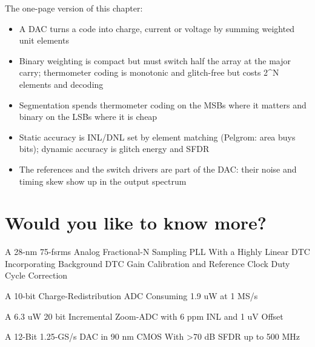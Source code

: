 The one-page version of this chapter:

\begin{itemize}
\tightlist
\item
  A DAC turns a code into charge, current or voltage by summing weighted
  unit elements
\item
  Binary weighting is compact but must switch half the array at the
  major carry; thermometer coding is monotonic and glitch-free but costs
  2\^{}N elements and decoding
\item
  Segmentation spends thermometer coding on the MSBs where it matters
  and binary on the LSBs where it is cheap
\item
  Static accuracy is INL/DNL set by element matching (Pelgrom: area buys
  bits); dynamic accuracy is glitch energy and SFDR
\item
  The references and the switch drivers are part of the DAC: their noise
  and timing skew show up in the output spectrum
\end{itemize}

\section{Would you like to know
more?}\label{would-you-like-to-know-more}

A 28-nm 75-fsrms Analog Fractional-N Sampling PLL With a Highly Linear
DTC Incorporating Background DTC Gain Calibration and Reference Clock
Duty Cycle Correction 

A 10-bit Charge-Redistribution ADC Consuming 1.9 uW at 1 MS/s

A 6.3 uW 20 bit Incremental Zoom-ADC with 6 ppm INL and 1 uV Offset

A 12-Bit 1.25-GS/s DAC in 90 nm CMOS With \textgreater70 dB SFDR up to
500 MHz 


